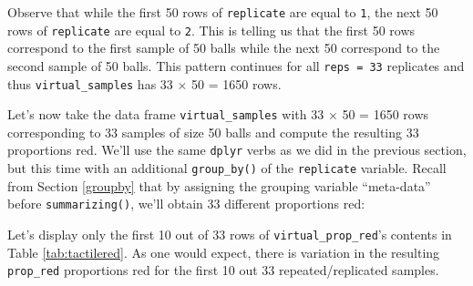 \documentclass[12pt, krantz2,]{krantz}
\makeatletter
\newenvironment{Shaded}{\begin{snugshade}}{\end{snugshade}}
\newcommand{\DataTypeTok}[1]{\textcolor[rgb]{0.27,0.27,0.27}{#1}}
\newcommand{\DecValTok}[1]{\textcolor[rgb]{0.06,0.06,0.06}{#1}}
\newcommand{\KeywordTok}[1]{\textcolor[rgb]{0.27,0.27,0.27}{\textbf{#1}}}
\newcommand{\NormalTok}[1]{#1}
\newcommand{\OperatorTok}[1]{\textcolor[rgb]{0.43,0.43,0.43}{\textbf{#1}}}
\newcommand{\StringTok}[1]{\textcolor[rgb]{0.5,0.5,0.5}{#1}}
\newenvironment{kframe}{%
\medskip{}
\setlength{\fboxsep}{.8em}
 \def\at@end@of@kframe{}%
 \ifinner\ifhmode%
  \def\at@end@of@kframe{\end{minipage}}%
  \begin{minipage}{\columnwidth}%
 \fi\fi%
 \def\FrameCommand##1{\hskip\@totalleftmargin \hskip-\fboxsep
 \colorbox{shadecolor}{##1}\hskip-\fboxsep
     \hskip-\linewidth \hskip-\@totalleftmargin \hskip\columnwidth}%
 \MakeFramed {\advance\hsize-\width
   \@totalleftmargin\z@ \linewidth\hsize
   \@setminipage}}%
 {\par\unskip\endMakeFramed%
 \at@end@of@kframe}
\renewenvironment{Shaded}{\begin{kframe}}{\end{kframe}}
\makeatother
\begin{document}
\begin{Shaded}
\end{Shaded}

Observe that while the first 50 rows of \texttt{replicate} are equal to \texttt{1}, the next 50 rows of \texttt{replicate} are equal to \texttt{2}. This is telling us that the first 50 rows correspond to the first sample of 50 balls while the next 50 correspond to the second sample of 50 balls. This pattern continues for all \texttt{reps\ =\ 33} replicates and thus \texttt{virtual\_samples} has 33 \(\times\) 50 = 1650 rows.

Let's now take the data frame \texttt{virtual\_samples} with 33 \(\times\) 50 = 1650 rows corresponding to 33 samples of size 50 balls and compute the resulting 33 proportions red. We'll use the same \texttt{dplyr} verbs as we did in the previous section, but this time with an additional \texttt{group\_by()} of the \texttt{replicate} variable. Recall from Section \ref{groupby} that by assigning the grouping variable ``meta-data'' before \texttt{summarizing()}, we'll obtain 33 different proportions red:

\begin{Shaded}
\end{Shaded}

Let's display only the first 10 out of 33 rows of \texttt{virtual\_prop\_red}'s contents in Table \ref{tab:tactilered}. As one would expect, there is variation in the resulting \texttt{prop\_red} proportions red for the first 10 out 33 repeated/replicated samples.
\end{document}
